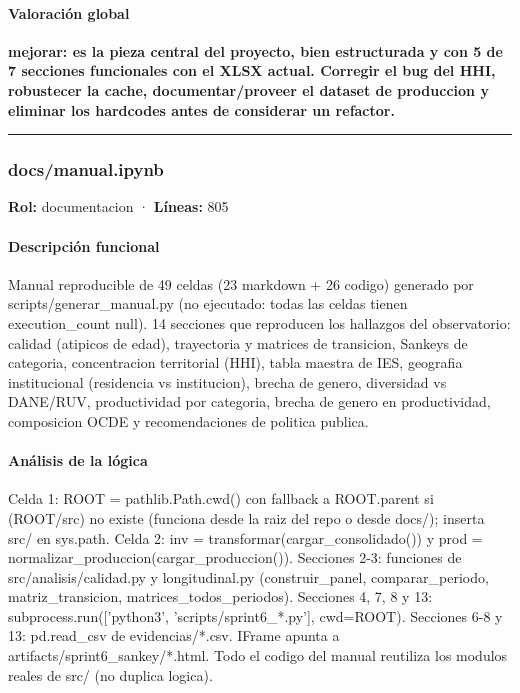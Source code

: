\paragraph{Valoración global}
\textbf{mejorar: es la pieza central del proyecto, bien estructurada y con 5 de 7 secciones funcionales con el XLSX actual. Corregir el bug del HHI, robustecer la cache, documentar/proveer el dataset de produccion y eliminar los hardcodes antes de considerar un refactor.}

\medskip
\hrule

\subsubsection{docs/manual.ipynb}
\textbf{Rol:} documentacion · \textbf{Líneas:} 805

\paragraph{Descripción funcional}
Manual reproducible de 49 celdas (23 markdown + 26 codigo) generado por scripts/generar\_manual.py (no ejecutado: todas las celdas tienen execution\_count null). 14 secciones que reproducen los hallazgos del observatorio: calidad (atipicos de edad), trayectoria y matrices de transicion, Sankeys de categoria, concentracion territorial (HHI), tabla maestra de IES, geografia institucional (residencia vs institucion), brecha de genero, diversidad vs DANE/RUV, productividad por categoria, brecha de genero en productividad, composicion OCDE y recomendaciones de politica publica.

\paragraph{Análisis de la lógica}
Celda 1: ROOT = pathlib.Path.cwd() con fallback a ROOT.parent si (ROOT/src) no existe (funciona desde la raiz del repo o desde docs/); inserta src/ en sys.path. Celda 2: inv = transformar(cargar\_consolidado()) y prod = normalizar\_produccion(cargar\_produccion()). Secciones 2-3: funciones de src/analisis/calidad.py y longitudinal.py (construir\_panel, comparar\_periodo, matriz\_transicion, matrices\_todos\_periodos). Secciones 4, 7, 8 y 13: subprocess.run(['python3', 'scripts/sprint6\_*.py'], cwd=ROOT). Secciones 6-8 y 13: pd.read\_csv de evidencias/*.csv. IFrame apunta a artifacts/sprint6\_sankey/*.html. Todo el codigo del manual reutiliza los modulos reales de src/ (no duplica logica).


